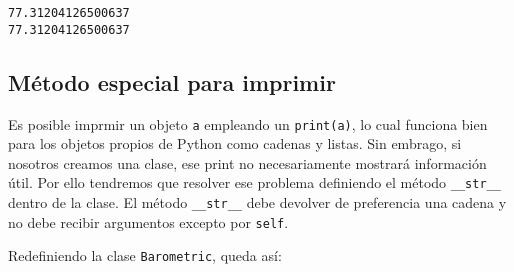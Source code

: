 \begin{Verbatim}[commandchars=\\\{\}]
77.31204126500637
77.31204126500637
\end{Verbatim}

\subsection{Método especial para imprimir}

Es posible imprmir un objeto \texttt{a} empleando un \texttt{print(a)},
lo cual funciona bien para los objetos propios de Python como cadenas y
listas. Sin embrago, si nosotros creamos una clase, ese print no
necesariamente mostrará información útil. Por ello tendremos que
resolver ese problema definiendo el método \texttt{\_\_str\_\_} dentro
de la clase. El método \texttt{\_\_str\_\_} debe devolver de preferencia
una cadena y no debe recibir argumentos excepto por \texttt{self}.

Redefiniendo la clase \texttt{Barometric}, queda así:

